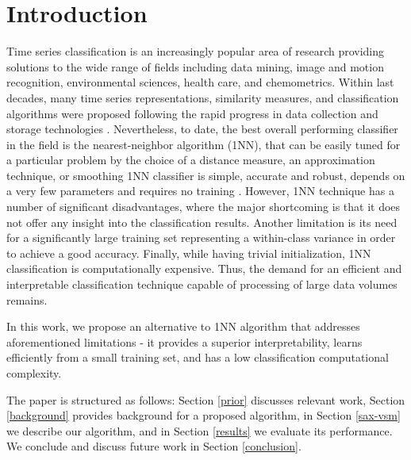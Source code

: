 \documentclass[conference]{IEEEtran}
\begin{document}
%

\vspace{-0.1cm}
\section{Introduction}
\vspace{-0.1cm}
Time series classification is an increasingly popular area of research providing 
solutions to the wide range of fields including data mining, 
image and motion recognition, environmental sciences, health care, and chemometrics. 
Within last decades, many time series representations, similarity measures, 
and classification algorithms were proposed following the rapid
progress in data collection and storage technologies \cite{review}. 
Nevertheless, to date, the best overall performing classifier in the field is
the nearest-neighbor algorithm (1NN), that can be easily tuned for a 
particular problem by the choice of a distance measure, 
an approximation technique, or smoothing \cite{review}
1NN classifier is simple, accurate and robust, depends on a very few parameters 
and requires no training \cite{review, benchmark, classifiers}.
However, 1NN technique has a number of significant disadvantages, where the 
major shortcoming is that it does not 
offer any insight into the classification results.
Another limitation is its need for a significantly large training set 
representing a within-class variance in order to achieve a good accuracy. 
Finally, while having trivial initialization, 1NN classification is computationally expensive. 
Thus, the demand for an efficient and interpretable classification technique 
capable of processing of large data volumes remains.

In this work, we propose an alternative to 1NN algorithm that addresses 
aforementioned limitations - it provides a superior interpretability, 
learns efficiently from a small training set, and has a low classification 
computational complexity.

The paper is structured as follows: 
Section \ref{prior} discusses relevant work, Section \ref{background} provides 
background for a proposed algorithm, in Section \ref{sax-vsm} we describe our algorithm, 
and in Section \ref{results} we evaluate its performance. 
We conclude and discuss future work in Section \ref{conclusion}.
\end{document}
